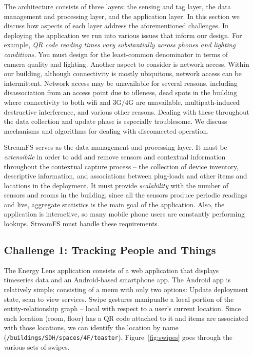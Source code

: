 The architecture consists of three layers: the sensing and tag layer, the data management and processing layer, and the application
layer.  In this section we discuss how aspects of each layer address the aforementioned challenges.
In deploying the application we run into various issues that inform our design.  
For example, \emph{QR code reading times vary substantially across phones
and lighting conditions}.  You must design for the least-common denominator in terms of camera quality and lighting.
Another aspect to consider is network access.  Within our building, although connectivity is mostly ubiquitous, network
access can be intermittent.  Network access may be unavailable for several reasons, including disassociation from an access point due
to idleness, dead spots in the building where connectivity to both wifi and 3G/4G are unavailable, multipath-induced
destructive interference, and various other reasons.  Dealing with these throughout the data collection and update phase is
especially troublesome.  We discuss mechanisms and algorithms for dealing with disconnected operation.

StreamFS serves as the data management and processing layer.  It must be \emph{extensibile} in order to add and remove
sensors and contextual information throughout the contextual capture process -- the collection of device inventory,
descriptive information, and associations between plug-loads and other items and locations in the deployment.
It must provide \emph{scalability} with the number of sensors and rooms in the building, since all the sensors produce periodic readings
and live, aggregate statistics is the main goal of the application.  Also, the application is interactive, so many mobile
phone users are constantly performing lookups.  StreamFS must handle these requirements.


\subsection{Challenge 1: Tracking People and Things}
\label{sec:tracking}

The Energy Lens application consists of a web application that displays timeseries data and an Android-based smartphone
app.
The Android app is relatively simple; consisting of a menu with only two options: Update deployment state, scan to view services.
Swipe gestures manipualte a local portion of the entity-relationship graph -- local with respect to a user's current location.
Since each location (room, floor) has a QR code attached to it and items are associated with those locations, we
can identify the location by name (\texttt{/buildings/SDH/spaces/4F/toaster}).  
Figure~\ref{fig:swipes} goes through the various sets 
of swipes.

